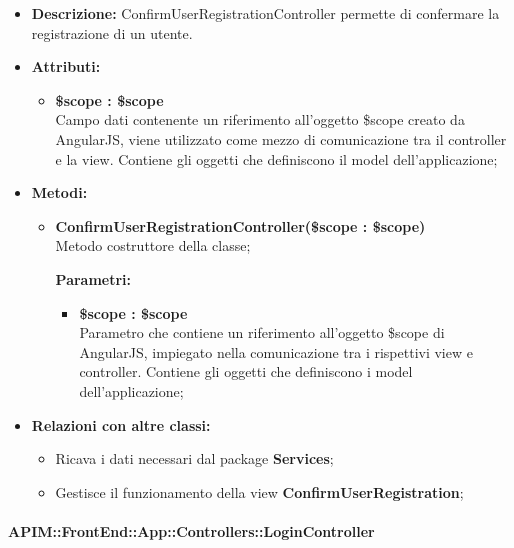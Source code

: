 \begin{itemize}
	\item \textbf{Descrizione:} ConfirmUserRegistrationController permette di confermare la registrazione di un utente.
	\item \textbf{Attributi:}
	\begin{itemize}
		
		\item \textbf{\$scope : \$scope}\\
		Campo dati contenente un riferimento all'oggetto \$scope creato da AngularJS, viene utilizzato come mezzo di comunicazione tra il controller e la view. Contiene gli oggetti che definiscono il model dell'applicazione;
		
	\end{itemize}
	\item \textbf{Metodi:}
	\begin{itemize}
		
		\item \textbf{ConfirmUserRegistrationController(\$scope : \$scope)}\\
		Metodo costruttore della classe;
		\begin{description}
			\item[\textbf{Parametri:}]
		\end{description}
		\begin{itemize}
			\item \textbf{\$scope : \$scope}\\
			Parametro che contiene un riferimento all'oggetto \$scope di AngularJS, impiegato nella comunicazione tra i rispettivi view e controller. Contiene gli oggetti che definiscono i model dell'applicazione;
			
		\end{itemize}		
		
	\end{itemize}
	\item \textbf{Relazioni con altre classi:}
	\begin{itemize}
		\item Ricava i dati necessari dal package \textbf{Services};
		\item Gestisce il funzionamento della view \textbf{ConfirmUserRegistration};
	\end{itemize}
\end{itemize}

\paragraph{APIM::FrontEnd::App::Controllers::LoginController}

